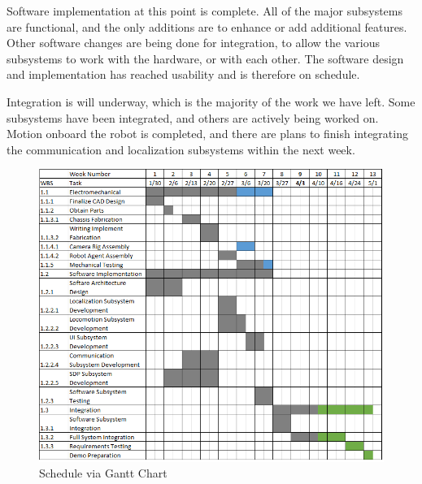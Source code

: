 Software implementation at this point is complete. All of the major subsystems are functional, and the only additions are to enhance or add additional features. Other software changes are being done for integration, to allow the various subsystems to work with the hardware, or with each other. The software design and implementation has reached usability and is therefore on schedule.

Integration is will underway, which is the majority of the work we have left. Some subsystems have been integrated, and others are actively being worked on. Motion onboard the robot is completed, and there are plans to finish integrating the communication and localization subsystems within the next week.

\begin{figure}[h!]
\centering
\includegraphics[width=0.6\columnwidth]{figs/gantt_chart_4_3_17.png}
\caption{Schedule via Gantt Chart}
\label{fig:gantt_4_3}
\end{figure}
